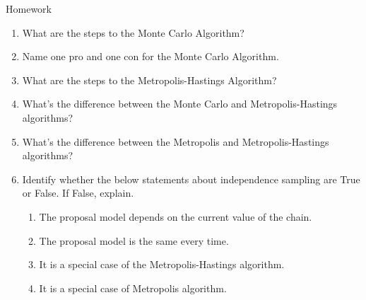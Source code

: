 \documentclass[aspectratio=43,11pt]{beamer}
\begin{document}
\begin{frame}{Homework}
\begin{enumerate}
\item What are the steps to the Monte Carlo Algorithm?
\item Name one pro and one con for the Monte Carlo Algorithm.
\item What are the steps to the Metropolis-Hastings Algorithm?
\item What’s the difference between the Monte Carlo and Metropolis-Hastings algorithms?
\item What’s the difference between the Metropolis and Metropolis-Hastings algorithms?
\item Identify whether the below statements about independence sampling are True or False. If False, explain.
\begin{enumerate}
\item The proposal model depends on the current value of the chain.
\item The proposal model is the same every time.
\item It is a special case of the Metropolis-Hastings algorithm.
\item It is a special case of Metropolis algorithm.
\end{enumerate}
\end{enumerate}
\end{frame}
\end{document}
